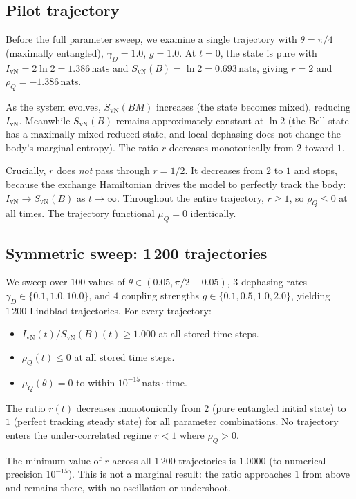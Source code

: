 \documentclass[12pt,a4paper]{article}
\newcommand{\SvN}{S_{\mathrm{vN}}}
\newcommand{\IvN}{I_{\mathrm{vN}}}
\newcommand{\rhoQ}{\rho_Q}
\newcommand{\muQ}{\mu_Q}
\newcommand{\nats}{\,\mathrm{nats}}
\begin{document}
\subsection{Pilot trajectory}

Before the full parameter sweep, we examine a single trajectory
with $\theta = \pi/4$ (maximally entangled), $\gamma_D = 1.0$,
$g = 1.0$.  At $t = 0$, the state is pure with
$\IvN = 2\ln 2 = 1.386\nats$ and $\SvN(B) = \ln 2 =
0.693\nats$, giving $r = 2$ and $\rhoQ = -1.386\nats$.

As the system evolves, $\SvN(BM)$ increases (the state becomes
mixed), reducing $\IvN$.  Meanwhile $\SvN(B)$ remains approximately
constant at $\ln 2$ (the Bell state has a maximally mixed reduced
state, and local dephasing does not change the body's marginal
entropy).  The ratio $r$ decreases monotonically from $2$ toward
$1$.

Crucially, $r$ does \emph{not} pass through $r = 1/2$.  It
decreases from $2$ to $1$ and stops, because the exchange
Hamiltonian drives the model to perfectly track the body:
$\IvN \to \SvN(B)$ as $t \to \infty$.  Throughout the entire
trajectory, $r \ge 1$, so $\rhoQ \le 0$ at all times.  The
trajectory functional $\muQ = 0$ identically.

\subsection{Symmetric sweep: 1\,200 trajectories}

We sweep over $100$ values of $\theta \in (0.05, \pi/2 - 0.05)$,
$3$ dephasing rates $\gamma_D \in \{0.1, 1.0, 10.0\}$, and $4$
coupling strengths $g \in \{0.1, 0.5, 1.0, 2.0\}$, yielding
$1\,200$ Lindblad trajectories.  For every trajectory:
\begin{itemize}
  \item $\IvN(t)/\SvN(B)(t) \ge 1.000$ at all stored time steps.
  \item $\rhoQ(t) \le 0$ at all stored time steps.
  \item $\muQ(\theta) = 0$ to within $10^{-15}\nats\!\cdot\!
    \mathrm{time}$.
\end{itemize}
The ratio $r(t)$ decreases monotonically from $2$ (pure entangled
initial state) to $1$ (perfect tracking steady state) for all
parameter combinations.  No trajectory enters the under-correlated
regime $r < 1$ where $\rhoQ > 0$.

The minimum value of $r$ across all $1\,200$ trajectories is
$1.0000$ (to numerical precision $10^{-15}$).  This is not a
marginal result: the ratio approaches $1$ from above and remains
there, with no oscillation or undershoot.
\end{document}
